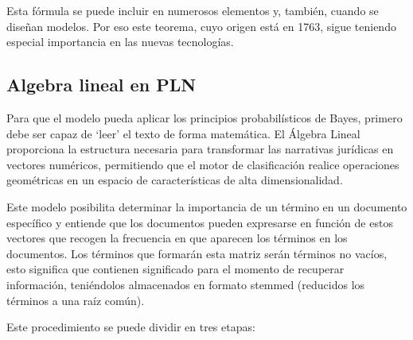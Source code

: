 Esta fórmula se puede incluir en numerosos elementos y, también, cuando se diseñan modelos. Por eso este teorema, cuyo origen está en 1763, sigue teniendo especial importancia en las nuevas tecnologías.

\subsection{Algebra lineal en PLN}

Para que el modelo pueda aplicar los principios probabilísticos de Bayes, primero debe ser capaz de ‘leer’ el texto de forma matemática. El Álgebra Lineal proporciona la estructura necesaria para transformar las narrativas jurídicas en vectores numéricos, permitiendo que el motor de clasificación realice operaciones geométricas en un espacio de características de alta dimensionalidad.

Este modelo posibilita determinar la importancia de un término en un documento específico y entiende que los documentos pueden expresarse en función de estos vectores que recogen la frecuencia en que aparecen los términos en los documentos. Los términos que formarán esta matriz serán términos no vacíos, esto significa que contienen significado para el momento de recuperar información, teniéndolos almacenados en formato stemmed (reducidos los términos a una raíz común).

Este procedimiento se puede dividir en tres etapas:

